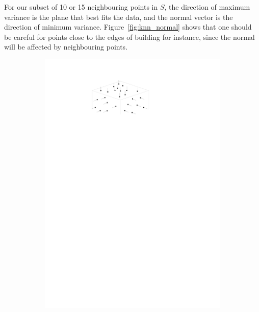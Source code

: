For our subset of 10 or 15 neighbouring points in $S$, the direction of maximum variance is the plane that best fits the data, and the normal vector is the direction of minimum variance.
Figure~\ref{fig:knn_normal} shows that one should be careful for points close to the edges of building for instance, since the normal will be affected by neighbouring points.
\begin{figure}
  \centering
  \begin{subfigure}[b]{0.3\linewidth}
    \centering
    \includegraphics[width=\textwidth,page=1]{normal.pdf}
    \caption{}\label{fig:normal:a}
  \end{subfigure}
  \qquad
  \begin{subfigure}[b]{0.3\linewidth}
    \centering

\end{subfigure}
\end{figure}
